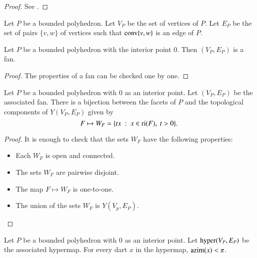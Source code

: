{{\begin{proof} See \cite{webster:1994}.
\end{proof}

\begin{definition} Let $P$ be a bounded polyhedron.
Let $V_P$ be the set of vertices of $P$.  Let $E_P$ be the set of pairs $\{v,w\}$ of vertices such that ${\operatorname{conv}}\{v,w\}$ is an edge of $P$.
\end{definition}

\begin{lemma}\label{lemma:polyhedron}%
Let $P$ be a bounded polyhedron with the interior point $0$.
Then $(V_P,E_P)$ is a fan.
\end{lemma}

\begin{proof} The properties of a fan can be checked one by one.
\end{proof}

\begin{lemma} Let $P$ be a bounded polyhedron with $0$ as an interior point.  Let $(V_P,E_P)$ be the associated fan.  There is a bijection between the facets of $P$ and the topological components of $Y(V_P,E_P)$ given by 
$$
F \mapsto W_F = \{t x \ :\  x\in {\operatorname{ri}}(F),~t >0\}.
$$
\end{lemma}

\begin{proof} It is enough to check that the sets $W_F$ have the following properties:
\begin{itemize}
\item Each $W_F$ is open and connected.
\item The sets $W_F$ are pairwise disjoint.
\item The map $F\mapsto W_F$ is one-to-one.
\item The union of the sets $W_F$ is $Y(V_p,E_P)$.
\end{itemize}
\end{proof}


\begin{lemma} Let $P$ be a bounded polyhedron with $0$ as an interior point.  Let ${\operatorname{hyper}}(V_P,E_P)$ be the associated hypermap.  For every dart $x$ in the hypermap, ${\operatorname{azim}}(x) < \pi$.
\end{lemma}

}}
